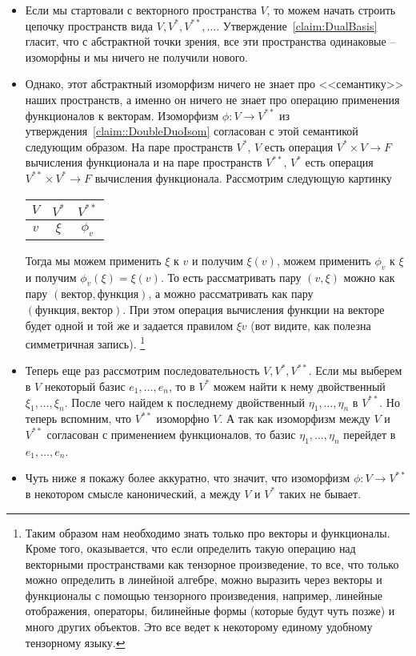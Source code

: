 \begin{itemize}
\item Если мы стартовали с векторного пространства $V$, то можем начать строить цепочку пространств вида $V, V^*, V^{**}, \ldots$.
Утверждение~\ref{claim:DualBasis} гласит, что с абстрактной точки зрения, все эти пространства одинаковые -- изоморфны и мы ничего не получили нового.

\item Однако, этот абстрактный изоморфизм ничего не знает про <<семантику>> наших пространств, а именно он ничего не знает про операцию применения функционалов к векторам.
Изоморфизм $\phi\colon V\to V^{**}$ из утверждения~\ref{claim::DoubleDuoIsom} согласован с этой семантикой следующим образом.
На паре пространств $V^*$, $V$ есть операция $V^*\times V\to F$ вычисления функционала и на паре пространств $V^{**}$, $V^*$ есть операция $V^{**}\times V^*\to F$ вычисления функционала.
Рассмотрим следующую картинку
\begin{center}
\begin{tabular}{c|c|c}

{$V$}&{$V^*$}&{$V^{**}$}\\

\hline

{$v$}&{$\xi$}&{$\phi_v$}\\

\end{tabular}
\end{center}
Тогда мы можем применить $\xi$ к $v$ и получим $\xi(v)$, можем применить $\phi_v$ к $\xi$ и получим $\phi_v(\xi) = \xi(v)$.
То есть рассматривать пару $(v,\xi)$ можно как пару $(\text{вектор}, \text{функция})$, а можно рассматривать как пару $(\text{функция}, \text{вектор})$.
При этом операция вычисления функции на векторе будет одной и той же и задается правилом $\xi v$ (вот видите, как полезна симметричная запись).%
\footnote{Таким образом нам необходимо знать только про векторы и функционалы.
Кроме того, оказывается, что если определить такую операцию над векторными пространствами как тензорное произведение, то все, что только можно определить в линейной алгебре, можно выразить через векторы и функционалы с помощью тензорного произведения, например, линейные отображения, операторы, билинейные формы (которые будут чуть позже) и много других объектов.
Это все ведет к некоторому единому удобному тензорному языку.}

\item Теперь еще раз рассмотрим последовательность $V, V^*, V^{**}$.
Если мы выберем в $V$ некоторый базис $e_1,\ldots,e_n$, то в $V^*$ можем найти к нему двойственный $\xi_1,\ldots,\xi_n$.
После чего найдем к последнему двойственный $\eta_1,\ldots,\eta_n$ в $V^{**}$.
Но теперь вспомним, что $V^{**}$ изоморфно $V$.
А так как изоморфизм между $V$ и $V^{**}$ согласован с применением функционалов, то базис $\eta_1,\ldots,\eta_n$ перейдет в $e_1,\ldots,e_n$.

\item Чуть ниже я покажу более аккуратно, что значит, что изоморфизм $\phi\colon V\to V^{**}$ в некотором смысле канонический, а между $V$ и $V^*$ таких не бывает.
\end{itemize}


